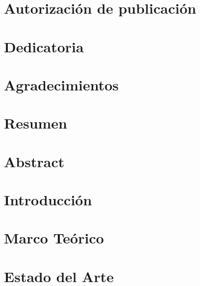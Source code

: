 \documentclass[12pt, twoside, openany]{book}
\begin{document}
    \chapter*{\centering
    Autorización de publicación}
    \label{chap:autorizacion}
    

    \chapter*{\centering Dedicatoria}
    \label{chap:dedication}
    

    \chapter*{\centering Agradecimientos}
    \label{chap:acknowledgments}
    

    \chapter*{\centering Resumen}
    \label{chap:resumen}
    

    \chapter*{\centering Abstract}
    \label{chap:abstract}
    

    \tableofcontents
    \printglossaries \listoftables \listoffigures

    \mainmatter

    \newpage

    \chapter{Introducción}
    \label{chap:intro}
    

    \chapter{Marco Teórico}
    \label{chap:theory}
    

    \chapter{Estado del Arte}
    \label{chap:state_of_art}
    
\end{document}
